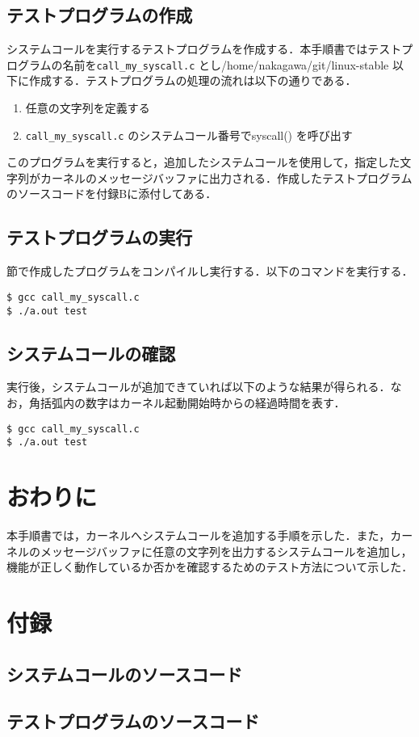 \documentclass[12pt]{jsarticle}
\begin{document}
\subsection{テストプログラムの作成}\label{sec:test_sakusei}
システムコールを実行するテストプログラムを作成する．本手順書ではテストプログラムの名前を\verb|call_my_syscall.c| とし/home/nakagawa/git/linux-stable 以下に作成する．テストプログラムの処理の流れは以下の通りである．
\begin{enumerate}
 \item 任意の文字列を定義する
 \item \verb|call_my_syscall.c| のシステムコール番号でsyscall() を呼び出す
\end{enumerate}
このプログラムを実行すると，追加したシステムコールを使用して，指定した文字列がカーネルのメッセージバッファに出力される．作成したテストプログラムのソースコードを付録Bに添付してある．
\subsection{テストプログラムの実行}
\label{ref:test_sakusei} 節で作成したプログラムをコンパイルし実行する．以下のコマンドを実行する．
\begin{verbatim}
$ gcc call_my_syscall.c
$ ./a.out test
\end{verbatim}
\subsection{システムコールの確認}
実行後，システムコールが追加できていれば以下のような結果が得られる．なお，角括弧内の数字はカーネル起動開始時からの経過時間を表す．
\begin{verbatim}
$ gcc call_my_syscall.c
$ ./a.out test
\end{verbatim}

\section{おわりに}\label{sec:owari}
本手順書では，カーネルへシステムコールを追加する手順を示した．また，カーネルのメッセージバッファに任意の文字列を出力するシステムコールを追加し，機能が正しく動作しているか否かを確認するためのテスト方法について示した．

\section{付録}\label{sec:huroku}
 \subsection{システムコールのソースコード}
  \subsection{テストプログラムのソースコード}


%
\end{document}
